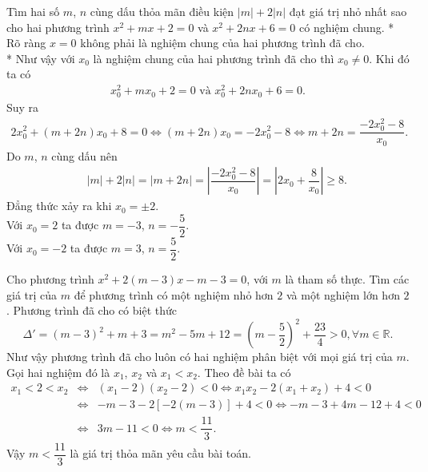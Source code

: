 \begin{ex}%
 Tìm hai số $m$, $n$ cùng dấu thỏa mãn điều kiện $|m| + 2|n|$ đạt giá trị nhỏ nhất sao cho hai phương trình $x^2+mx+2=0$ và $x^2+2nx+6=0$ có nghiệm chung.
 \loigiai
  {
  * Rõ ràng $x = 0$ không phải là nghiệm chung của hai phương trình đã cho.\\
  * Như vậy với $x_0$ là nghiệm chung của hai phương trình đã cho thì $x_0 \neq 0$. Khi đó ta có\\
  \begin{eqnarray*}
    x_0^2 + mx_0 + 2 = 0 \text{ và } x_0^2 + 2nx_0 + 6 = 0.
  \end{eqnarray*}
  Suy ra
  \begin{eqnarray*}
   2x_0^2 + (m + 2n)x_0 + 8 = 0 \Leftrightarrow (m + 2n)x_0 = -2x_0^2 - 8 \Leftrightarrow m + 2n = \dfrac{-2x_0^2 - 8}{x_0}.
  \end{eqnarray*}
  Do $m$, $n$ cùng dấu nên
  \allowdisplaybreaks
  \begin{eqnarray*}
   & & |m|+2|n| = |m+2n| = \left|\dfrac{-2x_0^2-8}{x_0}\right| = \left| 2x_0+\dfrac{8}{x_0}\right| \geq 8.
  \end{eqnarray*}
  Đẳng thức xảy ra khi $x_0 = \pm 2$.\\
  Với $x_0 = 2$ ta được $m=-3$, $n=-\dfrac{5}{2}$.\\
  Với $x_0 = -2$ ta được $m = 3$, $n = \dfrac{5}{2}$.
  }
\end{ex}

\begin{ex}%
 Cho phương trình $x^2+2(m-3)x-m-3=0$, với $m$ là tham số thực. Tìm các giá trị của $m$ để phương trình có một nghiệm nhỏ hơn $2$ và một nghiệm lớn hơn $2$.
 \loigiai
  {
  Phương trình đã cho có biệt thức $$\Delta' = (m-3)^2 + m + 3 = m^2 - 5m + 12 = \left(m-\dfrac{5}{2}\right)^2 + \dfrac{23}{4} > 0, \forall m \in \mathbb{R}.$$
  Như vậy phương trình đã cho luôn có hai nghiệm phân biệt với mọi giá trị của $m$. Gọi hai nghiệm đó là $x_1$, $x_2$ và $x_1 < x_2$. Theo đề bài ta có
  \begin{eqnarray*}
   x_1 < 2 <x_2 &\Leftrightarrow & (x_1 - 2)(x_2 - 2) < 0 \Leftrightarrow x_1x_2 - 2(x_1 + x_2) + 4 < 0\\
   &\Leftrightarrow & -m-3-2\left[-2(m-3)\right] + 4 < 0 \Leftrightarrow -m-3+4m-12+4<0\\
   &\Leftrightarrow & 3m-11<0 \Leftrightarrow m<\dfrac{11}{3}.
  \end{eqnarray*}
  Vậy $m<\dfrac{11}{3}$ là giá trị thỏa mãn yêu cầu bài toán.
  }
\end{ex}

